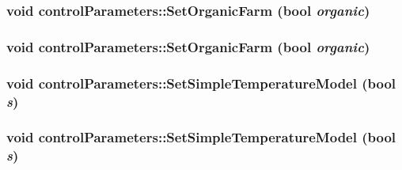 \label{classcontrol_parameters_a020ac9a97ec3af51bb2a921810a7cfcd}
\hypertarget{classcontrol_parameters_a52407c9d80f3f391105c8cd6b04cc409}{
\subsubsection[{SetOrganicFarm}]{\setlength{\rightskip}{0pt plus 5cm}void controlParameters::SetOrganicFarm (bool {\em organic})}}
\label{classcontrol_parameters_a52407c9d80f3f391105c8cd6b04cc409}
\hypertarget{classcontrol_parameters_a52407c9d80f3f391105c8cd6b04cc409}{
\subsubsection[{SetOrganicFarm}]{\setlength{\rightskip}{0pt plus 5cm}void controlParameters::SetOrganicFarm (bool {\em organic})}}
\label{classcontrol_parameters_a52407c9d80f3f391105c8cd6b04cc409}
\hypertarget{classcontrol_parameters_a0c870fc072987d313076610284d36db8}{
\subsubsection[{SetSimpleTemperatureModel}]{\setlength{\rightskip}{0pt plus 5cm}void controlParameters::SetSimpleTemperatureModel (bool {\em s})}}
\label{classcontrol_parameters_a0c870fc072987d313076610284d36db8}
\hypertarget{classcontrol_parameters_a0c870fc072987d313076610284d36db8}{
\subsubsection[{SetSimpleTemperatureModel}]{\setlength{\rightskip}{0pt plus 5cm}void controlParameters::SetSimpleTemperatureModel (bool {\em s})}}
